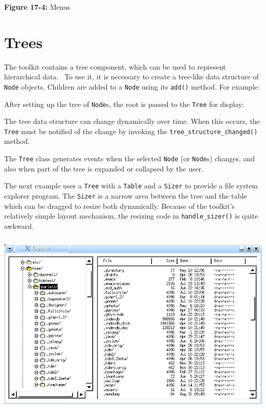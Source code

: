 {\sffamily\bfseries Figure 17-4:}
{\sffamily Menus}

\section{Trees}

The toolkit contains a tree component, which can be used to represent
hierarchical data. \ To use it, it is necessary to create a tree-like
data structure of \texttt{Node} objects. Children are added to a
\texttt{Node} using its \texttt{add()} method. For example:


After setting up the tree of \texttt{Node}s, the root is passed
to the \texttt{Tree} for display:


\noindent The tree data structure can change dynamically over time. When this
occurs, the \texttt{Tree} must be notified of the change by invoking
the \texttt{tree\_structure\_changed()} method.

The \texttt{Tree} class generates events when the selected \texttt{Node}
(or \texttt{Node}s) changes, and also when part of the tree is expanded
or collapsed by the user.

The next example uses a \texttt{Tree} with a \texttt{Table} and a
\texttt{Sizer} to provide a file system explorer program.
The \texttt{Sizer} is a narrow area between
the tree and the table which can be dragged to resize both dynamically.
Because of the toolkit's relatively simple layout
mechanism, the resizing code in \texttt{handle\_sizer()} is quite
awkward.



\begin{center}
\includegraphics[width=5.8134in,height=3.4898in]{ub-img/ub-img54.jpg}
\end{center}

